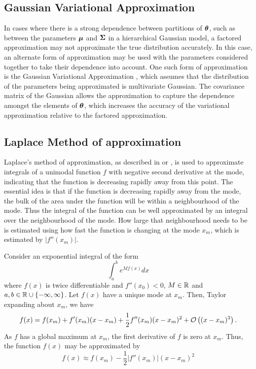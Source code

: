 \subsection{Gaussian Variational Approximation}

In cases where there is a strong dependence between partitions of ${\boldsymbol \theta}$,  such as between the parameters
${\boldsymbol \mu}$ and ${\boldsymbol \Sigma}$ in a hierarchical Gaussian model, a factored approximation may not approximate the true
distribution accurately. In this case, an alternate form of approximation may be used with the parameters
considered together to take their dependence into account. One such form of approximation is the Gaussian
Variational Approximation \cite{Ormerod2012}, which assumes that the distribution of the parameters being
approximated is multivariate Gaussian. The covariance matrix of the Gaussian allows the approximation to
capture the dependence amongst the elements of ${\boldsymbol \theta}$, which increases the accuracy of the variational
approximation relative to the factored approximation.

\subsection{Laplace Method of approximation}
\label{sec:laplace_approximation}
Laplace's method of approximation, as described in \cite{butler_2007} or \cite{MacKay:2002:ITI:971143}, is
used to approximate integrals of a unimodal function $f$ with negative second derivative at the mode,
indicating that the function is decreasing rapidly away from this point. The essential idea is that if the
function is decreasing rapidly away from the mode, the bulk of the area under the function will be within a
neighbourhood of the mode. Thus the integral of the function can be well approximated by an integral over the
neighbourhood of the mode. How large that neighbourhood needs to be is estimated using how fast the function
is changing at the mode $x_m$, which is estimated by $|f''(x_m)|$.

Consider an exponential integral of the form
$$
	\int_a^b e^{M f(x)} dx
$$
\noindent where $f(x)$ is twice differentiable and $f''(x_0) < 0$, $M \in {\mathbb{R}}$ and $a, b \in {\mathbb{R}} \cup \{-\infty,
\infty\}$. Let $f(x)$ have a unique mode at $x_m$. Then, Taylor expanding about $x_m$, we have
$$
	f(x) = f(x_m) + f'(x_m) (x - x_m) + \frac{1}{2} f''(x_m) (x - x_m)^2 + \mathcal{O}\left((x - x_m)^3\right).
$$
\noindent As $f$ has a global maximum at $x_m$, the first derivative of $f$ is zero at $x_m$. Thus, the
function $f(x)$ may be approximated by
$$
	f(x) \approx f(x_m) - \frac{1}{2} |f''(x_m)| (x - x_m)^2
$$

